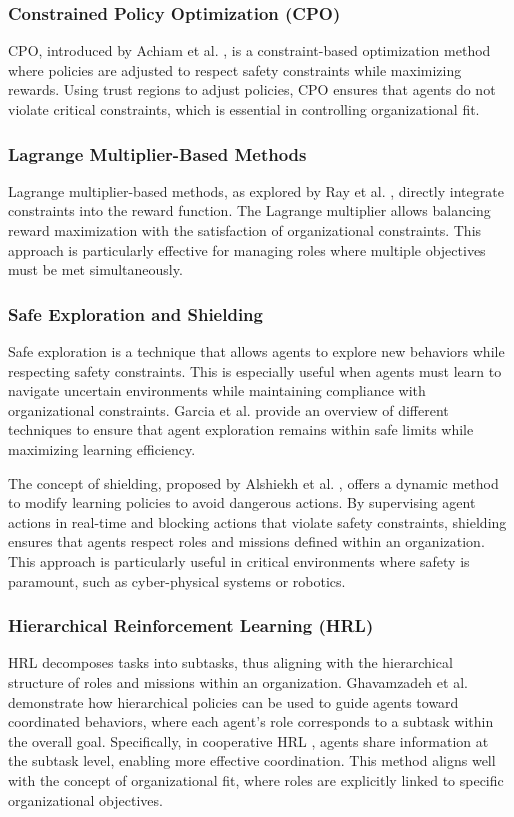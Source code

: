 \documentclass[sigconf,anonymous]{aamas}
\begin{document}
\subsubsection{Constrained Policy Optimization (CPO)}
CPO, introduced by Achiam et al. \cite{achiam2017cpo}, is a constraint-based optimization method where policies are adjusted to respect safety constraints while maximizing rewards. Using trust regions to adjust policies, CPO ensures that agents do not violate critical constraints, which is essential in controlling organizational fit.

\subsubsection{Lagrange Multiplier-Based Methods}
Lagrange multiplier-based methods, as explored by Ray et al. \cite{ray2019benchmarking}, directly integrate constraints into the reward function. The Lagrange multiplier allows balancing reward maximization with the satisfaction of organizational constraints. This approach is particularly effective for managing roles where multiple objectives must be met simultaneously.

\subsubsection{Safe Exploration and Shielding}
Safe exploration is a technique that allows agents to explore new behaviors while respecting safety constraints. This is especially useful when agents must learn to navigate uncertain environments while maintaining compliance with organizational constraints. Garcia et al. \cite{garcia2015comprehensive} provide an overview of different techniques to ensure that agent exploration remains within safe limits while maximizing learning efficiency.

The concept of shielding, proposed by Alshiekh et al. \cite{alshiekh2018safe}, offers a dynamic method to modify learning policies to avoid dangerous actions. By supervising agent actions in real-time and blocking actions that violate safety constraints, shielding ensures that agents respect roles and missions defined within an organization. This approach is particularly useful in critical environments where safety is paramount, such as cyber-physical systems or robotics.

\subsubsection{Hierarchical Reinforcement Learning (HRL)}
HRL decomposes tasks into subtasks, thus aligning with the hierarchical structure of roles and missions within an organization. Ghavamzadeh et al. \cite{ghavamzadeh2006hrl} demonstrate how hierarchical policies can be used to guide agents toward coordinated behaviors, where each agent's role corresponds to a subtask within the overall goal.
Specifically, in cooperative HRL \cite{ghavamzadeh2006cooperative}, agents share information at the subtask level, enabling more effective coordination. This method aligns well with the concept of organizational fit, where roles are explicitly linked to specific organizational objectives.
\end{document}

